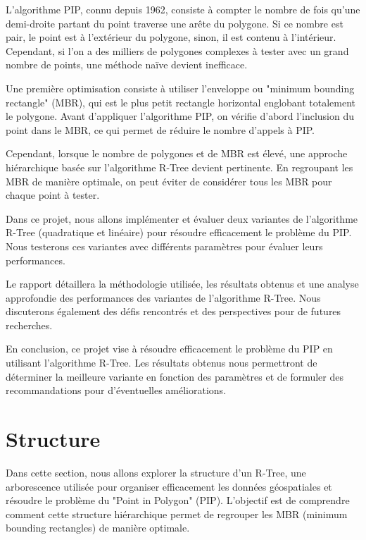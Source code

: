 \documentclass {article}
\begin{document}
L'algorithme PIP, connu depuis 1962, consiste à compter le nombre de fois qu'une demi-droite partant du point 
traverse une arête du polygone. Si ce nombre est pair, le point est à l'extérieur du polygone, sinon, 
il est contenu à l'intérieur. Cependant, si l'on a des milliers de polygones complexes à tester avec un 
grand nombre de points, une méthode naïve devient inefficace.

Une première optimisation consiste à utiliser l'enveloppe ou "minimum bounding rectangle" (MBR), 
qui est le plus petit rectangle horizontal englobant totalement le polygone. Avant d'appliquer l'algorithme PIP, 
on vérifie d'abord l'inclusion du point dans le MBR, ce qui permet de réduire le nombre d'appels à PIP.

Cependant, lorsque le nombre de polygones et de MBR est élevé, une approche hiérarchique basée sur l'algorithme R-Tree 
devient pertinente. En regroupant les MBR de manière optimale, on peut éviter de considérer tous les MBR pour 
chaque point à tester.

Dans ce projet, nous allons implémenter et évaluer deux variantes de l'algorithme R-Tree (quadratique et linéaire) 
pour résoudre efficacement le problème du PIP. Nous testerons ces variantes avec différents paramètres pour 
évaluer leurs performances.

Le rapport détaillera la méthodologie utilisée, les résultats obtenus et une analyse approfondie des performances 
des variantes de l'algorithme R-Tree. Nous discuterons également des défis rencontrés et des perspectives pour de 
futures recherches.


En conclusion, ce projet vise à résoudre efficacement le problème du PIP en utilisant l'algorithme 
R-Tree. 
Les résultats obtenus nous permettront de déterminer la meilleure variante en fonction des 
paramètres et de formuler des recommandations pour d'éventuelles améliorations.

\section {Structure}

Dans cette section, nous allons explorer la structure d'un R-Tree, une arborescence utilisée 
pour organiser efficacement les données géospatiales et résoudre le problème du 
"Point in Polygon" (PIP). L'objectif est de comprendre comment cette structure hiérarchique 
permet de regrouper les MBR (minimum bounding rectangles) de manière optimale.
\end{document}
